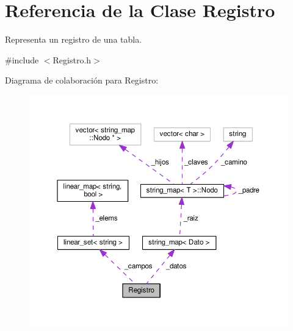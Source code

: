 \hypertarget{classRegistro}{\section{Referencia de la Clase Registro}
\label{classRegistro}
}


Representa un registro de una tabla.  




{\ttfamily \#include $<$Registro.\-h$>$}



Diagrama de colaboración para Registro\-:
\nopagebreak
\begin{figure}[H]
\begin{center}
\leavevmode
\includegraphics[width=350pt]{classRegistro__coll__graph}
\end{center}
\end{figure}
